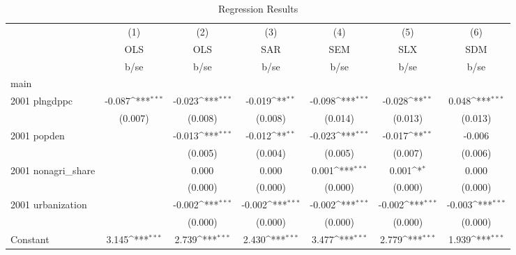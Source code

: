 \begin{table}[htbp]\centering
\def\sym#1{\ifmmode^{#1}\else\(^{#1}\)\fi}
\caption{Regression Results}
\begin{tabular}{l*{6}{c}}
\hline\hline
                    &\multicolumn{1}{c}{(1)}&\multicolumn{1}{c}{(2)}&\multicolumn{1}{c}{(3)}&\multicolumn{1}{c}{(4)}&\multicolumn{1}{c}{(5)}&\multicolumn{1}{c}{(6)}\\
                    &\multicolumn{1}{c}{OLS}&\multicolumn{1}{c}{OLS}&\multicolumn{1}{c}{SAR}&\multicolumn{1}{c}{SEM}&\multicolumn{1}{c}{SLX}&\multicolumn{1}{c}{SDM}\\
                    &        b/se         &        b/se         &        b/se         &        b/se         &        b/se         &        b/se         \\
\hline
main                &                     &                     &                     &                     &                     &                     \\
2001 plngdppc       &      -0.087\sym{***}&      -0.023\sym{***}&      -0.019\sym{**} &      -0.098\sym{***}&      -0.028\sym{**} &       0.048\sym{***}\\
                    &     (0.007)         &     (0.008)         &     (0.008)         &     (0.014)         &     (0.013)         &     (0.013)         \\
2001 popden         &                     &      -0.013\sym{***}&      -0.012\sym{**} &      -0.023\sym{***}&      -0.017\sym{**} &      -0.006         \\
                    &                     &     (0.005)         &     (0.004)         &     (0.005)         &     (0.007)         &     (0.006)         \\
2001 nonagri\_share  &                     &       0.000         &       0.000         &       0.001\sym{***}&       0.001\sym{*}  &       0.000         \\
                    &                     &     (0.000)         &     (0.000)         &     (0.000)         &     (0.000)         &     (0.000)         \\
2001 urbanization   &                     &      -0.002\sym{***}&      -0.002\sym{***}&      -0.002\sym{***}&      -0.002\sym{***}&      -0.003\sym{***}\\
                    &                     &     (0.000)         &     (0.000)         &     (0.000)         &     (0.000)         &     (0.000)         \\
Constant            &       3.145\sym{***}&       2.739\sym{***}&       2.430\sym{***}&       3.477\sym{***}&       2.779\sym{***}&       1.939\sym{***}\\

\end{tabular}
\end{table}
